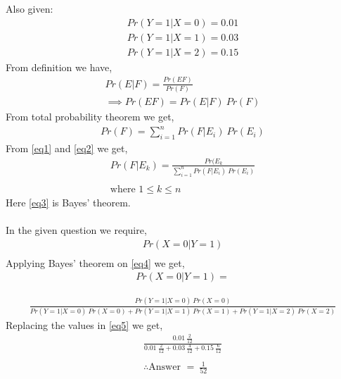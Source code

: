 \documentclass[journal,12pt,twocolumn]{IEEEtran}
\begin{document}
Also given: \\
\begin{align}
    Pr(Y=1|X=0) = 0.01 \\
    Pr(Y=1|X=1) = 0.03 \\
    Pr(Y=1|X=2) = 0.15
\end{align}
From definition we have,
\begin{align}
    Pr(E|F) = \frac{Pr(EF)}{Pr(F)}\\
    \implies Pr(EF) = Pr(E|F)\:Pr(F) \label{eq1}
\end{align}
From total probability theorem we get,
\begin{align}
    Pr(F) = \sum_{i=1}^n Pr(F|E_{i})\:Pr(E_{i}) \label{eq2}
\end{align}
From \ref{eq1} and \ref{eq2} we get,
\begin{align}
    Pr(F|E_{k}) = \frac{Pr(E_{k}}{\sum_{i=1}^n Pr(F|E_{i})\:Pr(E_{i})} \label{eq3}\\
    \nonumber\\
    \text{where }  1\leq k\leq n \nonumber
\end{align}
Here \ref{eq3} is Bayes' theorem.\\ \\
In the given question we require,
\begin{align}
    Pr(X=0|Y=1) \label{eq4}\\
\end{align}
Applying Bayes' theorem on \ref{eq4} we get,
\scriptsize
\begin{align}
    Pr(X=0|Y=1) = \nonumber
\end{align}

\begin{align}
    \frac{Pr(Y=1|X=0)\:Pr(X=0)}{Pr(Y=1|X=0)\:Pr(X=0)+Pr(Y=1|X=1)\:Pr(X=1)+Pr(Y=1|X=2)\:Pr(X=2)}\label{eq5}
\end{align}
\normalsize
Replacing the values in \ref{eq5} we get,
\begin{align}
    \frac{0.01\:\frac{2}{12}}{0.01\:\frac{2}{12}+0.03\:\frac{4}{12}+0.15\:\frac{6}{12}}\\
    \nonumber\\
    \therefore \text{Answer }= \:\frac{1}{52}
\end{align}
\end{document}

